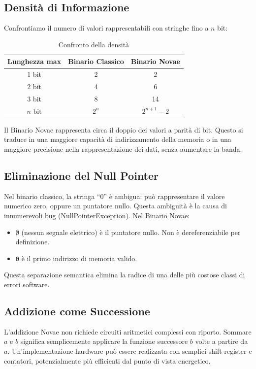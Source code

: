 \documentclass[11pt,a4paper,oneside]{article}
\begin{document}
\subsection{Densità di Informazione}
Confrontiamo il numero di valori rappresentabili con stringhe fino a $n$ bit:

\begin{table}[htbp]
\centering
\caption{Confronto della densità}
\begin{tabular}{c|c|c}
\toprule
\textbf{Lunghezza max} & \textbf{Binario Classico} & \textbf{Binario Novae} \\
\midrule
1 bit & 2 & 2 \\
2 bit & 4 & 6 \\
3 bit & 8 & 14 \\
$n$ bit & $2^n$ & $2^{n+1} - 2$ \\
\bottomrule
\end{tabular}
\end{table}

Il Binario Novae rappresenta circa il doppio dei valori a parità di bit. Questo si traduce in una maggiore capacità di indirizzamento della memoria o in una maggiore precisione nella rappresentazione dei dati, senza aumentare la banda.

\subsection{Eliminazione del Null Pointer}
Nel binario classico, la stringa ``0'' è ambigua: può rappresentare il valore numerico zero, oppure un puntatore nullo. Questa ambiguità è la causa di innumerevoli bug (NullPointerException).
Nel Binario Novae:
\begin{itemize}
\item $\emptyset$ (nessun segnale elettrico) è il puntatore nullo. Non è dereferenziabile per definizione.
\item \texttt{0} è il primo indirizzo di memoria valido.
\end{itemize}
Questa separazione semantica elimina la radice di una delle più costose classi di errori software.

\subsection{Addizione come Successione}
L'addizione Novae non richiede circuiti aritmetici complessi con riporto. Sommare $a$ e $b$ significa semplicemente applicare la funzione successore $b$ volte a partire da $a$. Un'implementazione hardware può essere realizzata con semplici shift register e contatori, potenzialmente più efficienti dal punto di vista energetico.
\end{document}

